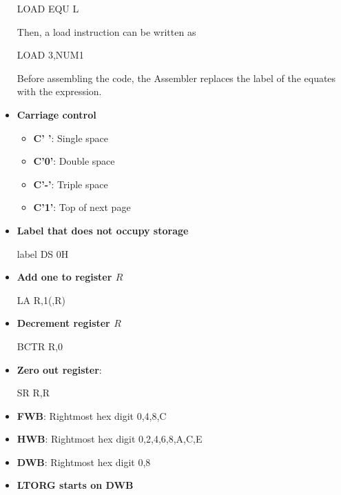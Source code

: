 \documentclass{report}
\begin{document}
\begin{itemize}
            \bigbreak \noindent 
            \begin{cppcode}
            LOAD  EQU  L
            \end{cppcode}
            \bigbreak \noindent 
            Then, a load instruction can be written as
            \bigbreak \noindent 
            \begin{cppcode}
            LOAD   3,NUM1
            \end{cppcode}
            \bigbreak \noindent 
            Before assembling the code, the Assembler replaces the label of the equates with the expression.
        \item \textbf{Carriage control}
            \begin{itemize}
                \item \textbf{C' '}: Single space 
                \item \textbf{C'0'}: Double space 
                \item \textbf{C'-'}: Triple space
                \item \textbf{C'1'}: Top of next page
            \end{itemize}
        \item \textbf{Label that does not occupy storage}
            \bigbreak \noindent 
            \begin{cppcode}
            label    DS    0H
            \end{cppcode}
        \item \textbf{Add one to register $R$}
            \begin{cppcode}
                LA   R,1(,R)
            \end{cppcode}
        \item \textbf{Decrement register $R$}
            \begin{cppcode}
                BCTR R,0 
            \end{cppcode}
        \item \textbf{Zero out register}:
            \begin{cppcode}
                SR   R,R
            \end{cppcode}
        \item \textbf{FWB}: Rightmost hex digit 0,4,8,C
        \item \textbf{HWB}: Rightmost hex digit 0,2,4,6,8,A,C,E
        \item \textbf{DWB}: Rightmost hex digit 0,8
        \item \textbf{LTORG starts on DWB}

\end{itemize}
\end{document}
